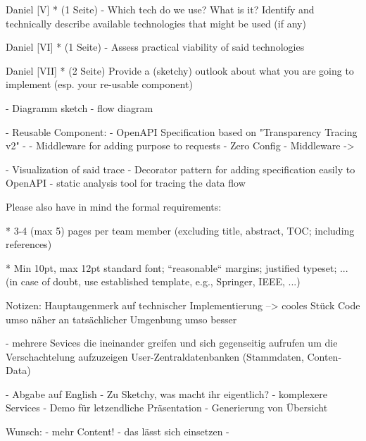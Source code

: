 Daniel 
[V] * (1 Seite) - Which tech do we use? What is it? 
Identify and technically describe available technologies that might be used (if any)


Daniel 
[VI] * (1 Seite) - 
Assess practical viability of said technologies




Daniel 
[VII] * (2 Seite)
Provide a (sketchy) outlook about what you are going to implement (esp. your re-usable component)

- Diagramm sketch 
- flow diagram 

 - Reusable Component: 
    - OpenAPI Specification based on "Transparency Tracing v2"
      - 
    - Middleware for adding purpose to requests 
    - Zero Config - Middleware -> %
    
    - Visualization of said trace 
    - Decorator pattern for adding specification easily to OpenAPI %
    - static analysis tool for tracing the data flow




Please also have in mind the formal requirements:

*
3-4 (max 5) pages per team member (excluding title, abstract, TOC;
including references)

*
Min 10pt, max 12pt standard font; “reasonable“ margins; justified
typeset; ... (in case of doubt, use established template, e.g., Springer,
IEEE, ...)


Notizen: 
Hauptaugenmerk auf technischer Implementierung --> cooles Stück Code umso näher an tatsächlicher Umgenbung umso besser

- mehrere Sevices die ineinander greifen und sich gegenseitig aufrufen um die Verschachtelung aufzuzeigen
User-Zentraldatenbanken (Stammdaten, Conten-Data) 


- Abgabe auf English 
- Zu Sketchy, was macht ihr eigentlich? 
- komplexere Services 
- Demo für letzendliche Präsentation
- Generierung von Übersicht

Wunsch: 
 - mehr Content! 
   - das lässt sich einsetzen
 - 
  